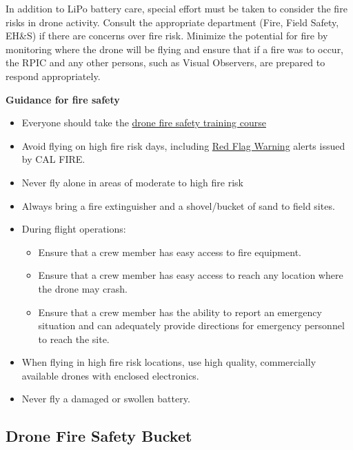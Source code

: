 \documentclass[
  12pt,
]{book}
\providecommand{\tightlist}{%
  \setlength{\itemsep}{0pt}\setlength{\parskip}{0pt}}
\begin{document}
In addition to LiPo battery care, special effort must be taken to consider the fire risks in drone activity. Consult the appropriate department (Fire, Field Safety, EH\&S) if there are concerns over fire risk. Minimize the potential for fire by monitoring where the drone will be flying and ensure that if a fire was to occur, the RPIC and any other persons, such as Visual Observers, are prepared to respond appropriately.

\textbf{Guidance for fire safety}

\begin{itemize}
\item
  Everyone should take the \href{https://ucdrones.github.io/library/trainings/FireSafety/index.html}{drone fire safety training course}
\item
  Avoid flying on high fire risk days, including \href{https://www.fire.ca.gov/programs/communications/red-flag-warnings-fire-weather-watches/}{Red Flag Warning} alerts issued by CAL FIRE.
\item
  Never fly alone in areas of moderate to high fire risk
\item
  Always bring a fire extinguisher and a shovel/bucket of sand to field sites.
\item
  During flight operations:

  \begin{itemize}
  \tightlist
  \item
    Ensure that a crew member has easy access to fire equipment.
  \item
    Ensure that a crew member has easy access to reach any location where the drone may crash.
  \item
    Ensure that a crew member has the ability to report an emergency situation and can adequately provide directions for emergency personnel to reach the site.
  \end{itemize}
\item
  When flying in high fire risk locations, use high quality, commercially available drones with enclosed electronics.
\item
  Never fly a damaged or swollen battery.
\end{itemize}

\hypertarget{drone-fire-safety-bucket}{%
\subsection{Drone Fire Safety Bucket}\label{drone-fire-safety-bucket}}
\end{document}
